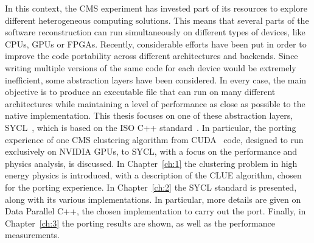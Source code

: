 In this context, the CMS experiment has invested part of its resources to explore different heterogeneous computing solutions. This means that several parts of the software reconstruction can run simultaneously on different types of devices, like CPUs, GPUs or FPGAs. Recently, considerable efforts have been put in order to improve the code portability across different architectures and backends. Since writing multiple versions of the same code for each device would be extremely inefficient, some abstraction layers have been considered. In every case, the main objective is to produce an executable file that can run on many different architectures while maintaining a level of performance as close as possible to the native implementation. \newline
This thesis focuses on one of these abstraction layers, SYCL~\cite{sycl_specification}, which is based on the ISO C++ standard~\cite{iso_c++}. In particular, the porting experience of one CMS clustering algorithm from CUDA~\cite{CUDA} code, designed to run exclusively on NVIDIA GPUs, to SYCL, with a focus on the performance and physics analysis, is discussed. \newline
In Chapter~\ref{ch:1} the clustering problem in high energy physics is introduced, with a description of the CLUE algorithm, chosen for the porting experience. 
In Chapter~\ref{ch:2} the SYCL standard is presented, along with its various implementations. In particular, more details are given on Data Parallel C++, the chosen implementation to carry out the port.
Finally, in Chapter~\ref{ch:3} the porting results are shown, as well as the performance measurements.
